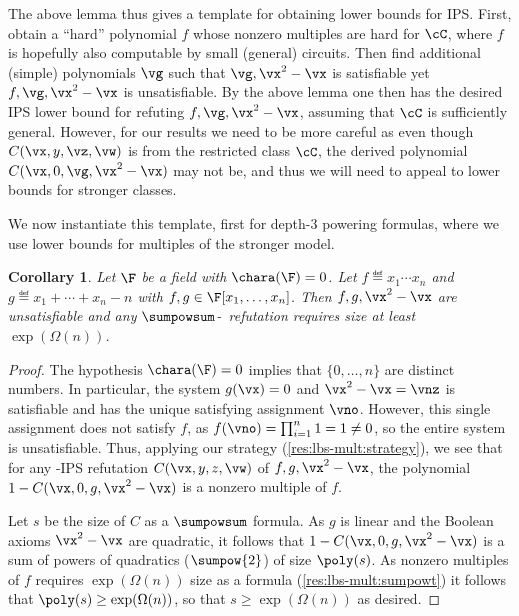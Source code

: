 \documentclass[11pt]{article}
\numberwithin{equation}{section}
\newtheorem{corollary}[theorem]{Corollary}
\theoremstyle{definition}
\theoremstyle{plain}
\begin{document}
The above lemma thus gives a template for obtaining lower bounds for IPS\@.  First, obtain a ``hard'' polynomial $f$ whose nonzero multiples are hard for $\cC$, where $f$ is hopefully also computable by small (general) circuits.  Then find additional (simple) polynomials $\vg$ such that $\vg,\vx^2-\vx$ is satisfiable yet $f,\vg,\vx^2-\vx$ is unsatisfiable.  By the above lemma one then has the desired IPS lower bound for refuting $f,\vg,\vx^2-\vx$, assuming that $\cC$ is sufficiently general.  However, for our results we need to be more careful as even though $C(\vx,y,\vz,\vw)$ is from the restricted class $\cC$, the derived polynomial $C(\vx,0,\vg,\vx^2-\vx)$ may not be, and
thus %
we will need to appeal to lower bounds for stronger classes.

We now instantiate this template, first for depth-3 powering formulas, where we use lower bounds for multiples of the stronger  model.

\begin{corollary}\label{res:lbs-ips:mult:sumpowsum}
        Let $\F$ be a field with $\chara(\F)=0$.  Let $f\eqdef x_1\cdots x_n$ and $g\eqdef x_1+\cdots+x_n-n$ with $f,g\in\F[x_1,\ldots,x_n]$.  Then $f,g,\vx^2-\vx$ are unsatisfiable and any $\sumpowsum$-\IPS\ refutation requires size at least $\exp(\Omega(n))$.
\end{corollary}
\begin{proof}
        The hypothesis $\chara(\F)=0$ implies that $\{0,\ldots,n\}$ are distinct numbers.  In particular, the system $g(\vx)=0$ and $\vx^2-\vx=\vnz$ is satisfiable and has the unique satisfying assignment $\vno$.  However, this single assignment does not satisfy $f$, %
        as $f(\vno)=\prod_{i=1}^n 1=1\ne 0$, so the entire system is unsatisfiable.  Thus, applying our strategy (\autoref{res:lbs-mult:strategy}), we see that for any \sumpowsum-IPS refutation $C(\vx,y,z,\vw)$ of $f,g,\vx^2-\vx$,
%
the polynomial %
$1-C(\vx,0,g,\vx^2-\vx)$ is a nonzero multiple of $f$.

        Let $s$ be the size of $C$ as a $\sumpowsum$ formula.  As $g$ is linear and the Boolean axioms $\vx^2-\vx$ are quadratic, it follows that $1-C(\vx,0,g,\vx^2-\vx)$ is a sum of powers of quadratics ($\sumpow{2}$) of size $\poly(s)$.  As nonzero multiples of $f$ requires
%
$\exp(\Omega(n))$ size    %
as a  formula (\autoref{res:lbs-mult:sumpowt}) it follows that $\poly(s)\ge\exp(\Omega(n))$, so that $s\ge\exp(\Omega(n))$ as desired.
\end{proof}
\end{document}
